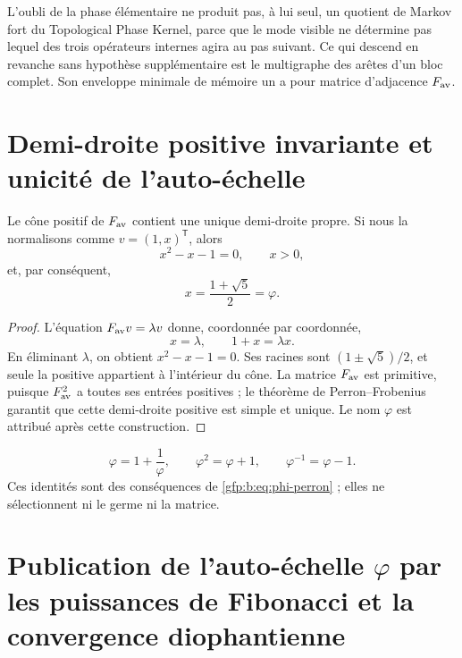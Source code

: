 \begin{remark}
L’oubli de la phase élémentaire ne produit pas, à lui seul, un quotient de Markov
fort du Topological Phase Kernel, parce que le mode visible ne détermine pas
lequel des trois opérateurs internes agira au pas suivant. Ce qui
descend en revanche sans hypothèse supplémentaire est le multigraphe des arêtes d’un
bloc complet. Son enveloppe minimale de mémoire un a pour matrice
d’adjacence \(F_{\rm av}\).
\end{remark}

\section{Demi-droite positive invariante et unicité de l’auto-échelle}

\begin{theorem}
\label{gfp:b:thm:rayo-perron-phi}
Le cône positif de \(F_{\rm av}\) contient une unique demi-droite propre. Si nous la
normalisons comme \(v=(1,x)^{\mathsf T}\), alors
\[
 x^2-x-1=0,
 \qquad
 x>0,
\]
et, par conséquent,
\begin{equation}
 \boxed{x=\frac{1+\sqrt5}{2}=\varphi.}
 \label{gfp:b:eq:phi-perron}
\end{equation}
\end{theorem}

\begin{proof}
L’équation \(F_{\rm av}v=\lambda v\) donne, coordonnée par coordonnée,
\[
 x=\lambda,
 \qquad
 1+x=\lambda x.
\]
En éliminant \(\lambda\), on obtient \(x^2-x-1=0\). Ses racines sont
\((1\pm\sqrt5)/2\), et seule la positive appartient à l’intérieur du cône. La
matrice \(F_{\rm av}\) est primitive, puisque \(F_{\rm av}^2\) a toutes ses
entrées positives ; le théorème de Perron--Frobenius garantit que cette demi-droite
positive est simple et unique. Le nom \(\varphi\) est attribué après cette
construction.
\end{proof}

\begin{corollary}
\[
 \varphi=1+\frac1\varphi,
 \qquad
 \varphi^2=\varphi+1,
 \qquad
 \varphi^{-1}=\varphi-1.
\]
Ces identités sont des conséquences de \eqref{gfp:b:eq:phi-perron} ; elles ne sélectionnent
ni le germe ni la matrice.
\end{corollary}

\section{Publication de l’auto-échelle \(\varphi\) par les puissances de Fibonacci et la convergence diophantienne}

